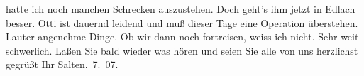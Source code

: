 \begin{ledgroupsized}[t]{13cm}
{{{               }}}\label{K_L03488-4h} hatte ich noch manchen Schrecken auszustehen. Doch geht’s ihm jetzt in Edlach besser. Otti ist dauernd leidend und muß dieser Tage eine Operation überstehen.
               Lauter angenehme Dinge. Ob wir dann noch fortreisen, weiss ich nicht. Sehr weit
               schwerlich. Laßen Sie bald wieder was hören und seien Sie alle von uns herzlichst
               gegrüßt\pend
           \pstart Ihr \spacefill\mbox{Salten}\pend{}. 7. 07.\pend
           
         
         \endnumbering{}\end{ledgroupsized}  \newcommand{\dateiname}{L03488}\newcommand{\titel}{Felix Salten an Arthur Schnitzler, 15. 7. 1907}\newcommand{\editorInnen}{Martin Anton Müller und Laura Untner}
      